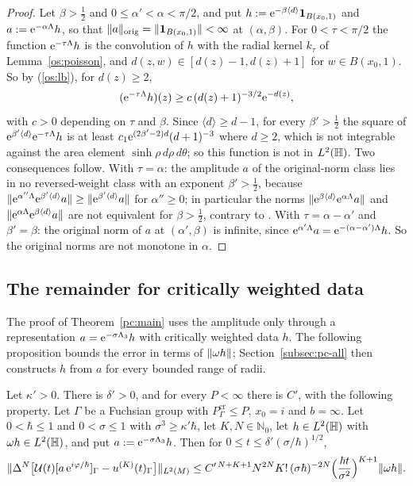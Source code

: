 \begin{proof}
Let $\beta>\tfrac12$ and $0\le\alpha'<\alpha<\pi/2$, and put $h:=\mathrm{e}^{-\beta\langle d\rangle}\mathbf 1_{B(x_0,1)}$ and $a:=\mathrm{e}^{-\alpha\Lambda}h$, so that
$\lVert a\rVert_{\mathrm{orig}}=\lVert \mathbf 1_{B(x_0,1)}\rVert<\infty$ at $(\alpha,\beta)$. For $0<\tau<\pi/2$ the function $\mathrm{e}^{-\tau\Lambda}h$ is the convolution of $h$ with the
radial kernel $k_\tau$ of Lemma~\ref{os:poisson}, and $d(z,w)\in[d(z)-1,d(z)+1]$ for $w\in B(x_0,1)$. So by \textup{(\ref{os:lb})}, for $d(z)\ge2$,
\[
  (\mathrm{e}^{-\tau\Lambda}h)(z)\ge c\,(d(z)+1)^{-3/2}\mathrm{e}^{-d(z)},
\]
with $c>0$ depending on $\tau$ and $\beta$. Since $\langle d\rangle\ge d-1$, for every $\beta'>\tfrac12$ the square of
$\mathrm{e}^{\beta'\langle d\rangle}\mathrm{e}^{-\tau\Lambda}h$ is at least $c_1\mathrm{e}^{(2\beta'-2)d}(d+1)^{-3}$ where $d\ge2$, which is not integrable against the area
element $\sinh\rho\,d\rho\,d\theta$; so this function is not in $L^2(\mathbb{H})$. Two consequences follow.
With $\tau=\alpha$: the amplitude $a$ of the original-norm class lies in no reversed-weight class with an exponent $\beta'>\tfrac12$, because
$\lVert \mathrm{e}^{\alpha''\Lambda}\mathrm{e}^{\beta'\langle d\rangle}a\rVert\ge\lVert \mathrm{e}^{\beta'\langle d\rangle}a\rVert$ for $\alpha''\ge0$; in particular the norms
$\lVert \mathrm{e}^{\beta\langle d\rangle}\mathrm{e}^{\alpha\Lambda}a\rVert$ and $\lVert \mathrm{e}^{\alpha\Lambda}\mathrm{e}^{\beta\langle d\rangle}a\rVert$ are not equivalent for $\beta>\tfrac12$, contrary to
\cite[Proposition~7.1, (7.2)]{S}.
With $\tau=\alpha-\alpha'$ and $\beta'=\beta$: the original norm of $a$ at $(\alpha',\beta)$ is infinite, since
$\mathrm{e}^{\alpha'\Lambda}a=\mathrm{e}^{-(\alpha-\alpha')\Lambda}h$. So the original norms are not monotone in $\alpha$.
\end{proof}





\subsection{The remainder for critically weighted data}\label{subsec:pc-proof}
The proof of Theorem~\ref{pc:main} uses the amplitude only through a representation $a=\mathrm{e}^{-\sigma\Lambda_3}h$ with
critically weighted data $h$. The following proposition bounds the error in terms of $\lVert \omega h\rVert$;
Section~\ref{subsec:pc-all} then constructs $h$ from $a$ for every bounded range of radii.

\begin{proposition}\label{pc:core}
Let $\kappa'>0$. There is $\delta'>0$, and for every $P<\infty$ there is $C'$, with the following property. Let $\Gamma$ be a Fuchsian
group with $P^{\mathrm{cr}}_\Gamma\le P$, $x_0=i$ and $b=\infty$. Let $0<\hbar\le1$ and $0<\sigma\le1$ with $\sigma^3\ge\kappa'\hbar$, let
$K,N\in\mathbb N_0$, let $h\in L^2(\mathbb{H})$ with $\omega h\in L^2(\mathbb{H})$, and put $a:=\mathrm{e}^{-\sigma\Lambda_3}h$. Then for
$0\le t\le\delta'(\sigma/\hbar)^{1/2}$,
\[
  \lVert \Delta^N\big[\mathcal{U}(t)[a\,\mathrm{e}^{i\varphi/\hbar}]_\Gamma-u^{(K)}(t)_\Gamma\big]\rVert_{L^2(M)}
  \le C'^{\,N+K+1}N^{2N}K!\,(\sigma\hbar)^{-2N}\Big(\frac{\hbar t}{\sigma^2}\Big)^{K+1}\lVert \omega h\rVert.
\]
\end{proposition}

